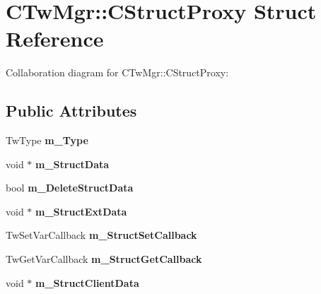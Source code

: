 \hypertarget{struct_c_tw_mgr_1_1_c_struct_proxy}{\section{C\+Tw\+Mgr\+:\+:C\+Struct\+Proxy Struct Reference}
\label{struct_c_tw_mgr_1_1_c_struct_proxy}
}


Collaboration diagram for C\+Tw\+Mgr\+:\+:C\+Struct\+Proxy\+:
\subsection*{Public Attributes}
\begin{DoxyCompactItemize}
\item 
\hypertarget{struct_c_tw_mgr_1_1_c_struct_proxy_aa8c53d98ea6f7641d2779a59a9c50d39}{Tw\+Type {\bfseries m\+\_\+\+Type}}\label{struct_c_tw_mgr_1_1_c_struct_proxy_aa8c53d98ea6f7641d2779a59a9c50d39}

\item 
\hypertarget{struct_c_tw_mgr_1_1_c_struct_proxy_a083d8272257f29b09c65c66d0ac5c56d}{void $\ast$ {\bfseries m\+\_\+\+Struct\+Data}}\label{struct_c_tw_mgr_1_1_c_struct_proxy_a083d8272257f29b09c65c66d0ac5c56d}

\item 
\hypertarget{struct_c_tw_mgr_1_1_c_struct_proxy_afaf063816684658309ed76750c1beccd}{bool {\bfseries m\+\_\+\+Delete\+Struct\+Data}}\label{struct_c_tw_mgr_1_1_c_struct_proxy_afaf063816684658309ed76750c1beccd}

\item 
\hypertarget{struct_c_tw_mgr_1_1_c_struct_proxy_a5c54be8549bc0b127bd0e26a5da95c76}{void $\ast$ {\bfseries m\+\_\+\+Struct\+Ext\+Data}}\label{struct_c_tw_mgr_1_1_c_struct_proxy_a5c54be8549bc0b127bd0e26a5da95c76}

\item 
\hypertarget{struct_c_tw_mgr_1_1_c_struct_proxy_a7d2679be4ae8c9bda211c35a72ee83aa}{Tw\+Set\+Var\+Callback {\bfseries m\+\_\+\+Struct\+Set\+Callback}}\label{struct_c_tw_mgr_1_1_c_struct_proxy_a7d2679be4ae8c9bda211c35a72ee83aa}

\item 
\hypertarget{struct_c_tw_mgr_1_1_c_struct_proxy_ab8c3def17571f36fa66514fe36b67ff2}{Tw\+Get\+Var\+Callback {\bfseries m\+\_\+\+Struct\+Get\+Callback}}\label{struct_c_tw_mgr_1_1_c_struct_proxy_ab8c3def17571f36fa66514fe36b67ff2}

\item 
\hypertarget{struct_c_tw_mgr_1_1_c_struct_proxy_a64f44463724489f7d52249a845fe868f}{void $\ast$ {\bfseries m\+\_\+\+Struct\+Client\+Data}}\label{struct_c_tw_mgr_1_1_c_struct_proxy_a64f44463724489f7d52249a845fe868f}


\end{DoxyCompactItemize}
